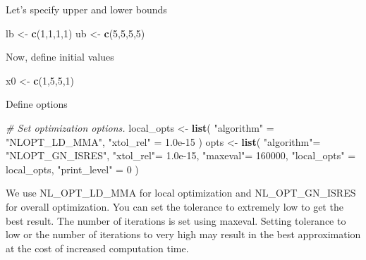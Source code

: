 \documentclass[onecolumn]{article}
\newenvironment{Shaded}{\begin{snugshade}}{\end{snugshade}}
\newcommand{\KeywordTok}[1]{\textcolor[rgb]{0.13,0.29,0.53}{\textbf{#1}}}
\newcommand{\DecValTok}[1]{\textcolor[rgb]{0.00,0.00,0.81}{#1}}
\newcommand{\FloatTok}[1]{\textcolor[rgb]{0.00,0.00,0.81}{#1}}
\newcommand{\StringTok}[1]{\textcolor[rgb]{0.31,0.60,0.02}{#1}}
\newcommand{\CommentTok}[1]{\textcolor[rgb]{0.56,0.35,0.01}{\textit{#1}}}
\newcommand{\NormalTok}[1]{#1}
\begin{document}
Let's specify upper and lower bounds

\begin{Shaded}
\begin{Highlighting}[]
\NormalTok{lb <-}\StringTok{ }\KeywordTok{c}\NormalTok{(}\DecValTok{1}\NormalTok{,}\DecValTok{1}\NormalTok{,}\DecValTok{1}\NormalTok{,}\DecValTok{1}\NormalTok{)}
\NormalTok{ub <-}\StringTok{ }\KeywordTok{c}\NormalTok{(}\DecValTok{5}\NormalTok{,}\DecValTok{5}\NormalTok{,}\DecValTok{5}\NormalTok{,}\DecValTok{5}\NormalTok{)}
\end{Highlighting}
\end{Shaded}

Now, define initial values

\begin{Shaded}
\begin{Highlighting}[]
\NormalTok{x0 <-}\StringTok{ }\KeywordTok{c}\NormalTok{(}\DecValTok{1}\NormalTok{,}\DecValTok{5}\NormalTok{,}\DecValTok{5}\NormalTok{,}\DecValTok{1}\NormalTok{)}
\end{Highlighting}
\end{Shaded}

Define options

\begin{Shaded}
\begin{Highlighting}[]
\CommentTok{# Set optimization options.}
\NormalTok{local_opts <-}\StringTok{ }\KeywordTok{list}\NormalTok{( }\StringTok{"algorithm"}\NormalTok{ =}\StringTok{ "NLOPT_LD_MMA"}\NormalTok{, }\StringTok{"xtol_rel"}\NormalTok{ =}\StringTok{ }\FloatTok{1.0e-15}\NormalTok{ )}
\NormalTok{opts <-}\StringTok{ }\KeywordTok{list}\NormalTok{( }\StringTok{"algorithm"}\NormalTok{=}\StringTok{ "NLOPT_GN_ISRES"}\NormalTok{,}
\StringTok{"xtol_rel"}\NormalTok{=}\StringTok{ }\FloatTok{1.0e-15}\NormalTok{,}
\StringTok{"maxeval"}\NormalTok{=}\StringTok{ }\DecValTok{160000}\NormalTok{,}
\StringTok{"local_opts"}\NormalTok{ =}\StringTok{ }\NormalTok{local_opts,}
\StringTok{"print_level"}\NormalTok{ =}\StringTok{ }\DecValTok{0}\NormalTok{ )}
\end{Highlighting}
\end{Shaded}

We use NL\_OPT\_LD\_MMA for local optimization and NL\_OPT\_GN\_ISRES
for overall optimization. You can set the tolerance to extremely low to
get the best result. The number of iterations is set using maxeval.
Setting tolerance to low or the number of iterations to very high may
result in the best approximation at the cost of increased computation
time.
\end{document}
